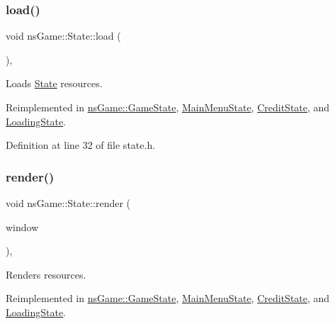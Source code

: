 \subsubsection{\texorpdfstring{load()}{load()}}
{\footnotesize\ttfamily void ns\+Game\+::\+State\+::load (\begin{DoxyParamCaption}{ }\end{DoxyParamCaption})\hspace{0.3cm}{\ttfamily [inline]}, {\ttfamily [virtual]}}



Loads \hyperlink{structns_game_1_1_state}{State} resources. 



Reimplemented in \hyperlink{classns_game_1_1_game_state_a66f7b8027a33f473fd22c212700586f2}{ns\+Game\+::\+Game\+State}, \hyperlink{class_main_menu_state_a723f41a3c34138c5c5f7dcafc076718e}{Main\+Menu\+State}, \hyperlink{class_credit_state_a32ec8ae5c12ee636cfd2b949b8e980e1}{Credit\+State}, and \hyperlink{class_loading_state_a66c29bb02cb85fbc522040dc23739118}{Loading\+State}.



Definition at line 32 of file state.\+h.

\mbox{\label{structns_game_1_1_state_a214f8ee52de4b318f1ed3861a578ce67}} 
\subsubsection{\texorpdfstring{render()}{render()}}
{\footnotesize\ttfamily void ns\+Game\+::\+State\+::render (\begin{DoxyParamCaption}\item[{Min\+GL \&}]{window }\end{DoxyParamCaption})\hspace{0.3cm}{\ttfamily [inline]}, {\ttfamily [virtual]}}



Renders resources. 



Reimplemented in \hyperlink{classns_game_1_1_game_state_a1e3179b016431332ecff880e09e267d3}{ns\+Game\+::\+Game\+State}, \hyperlink{class_main_menu_state_a1f11855f3b961e7a71c7c4e16f0b3478}{Main\+Menu\+State}, \hyperlink{class_credit_state_aa4ba316fca29d0e79ee70891e373a060}{Credit\+State}, and \hyperlink{class_loading_state_a64812e3f15d84b60ab8313509ba07520}{Loading\+State}.



